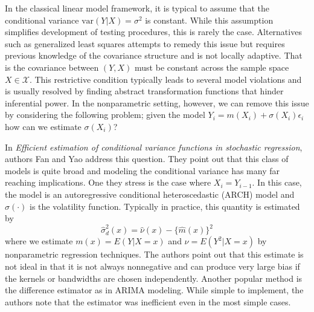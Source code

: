 \documentclass[12pt]{article}  %
\begin{document}
In the classical linear model framework, it is typical to assume that the conditional variance $\text{var}(Y|X) = \sigma^2$ is constant. While this assumption simplifies development of testing procedures, this is rarely the case. Alternatives such as generalized least squares attempts to remedy this issue but requires previous knowledge of the covariance structure and is not locally adaptive. That is the covariance between $(Y, X)$ must be constant across the sample space $X\in\mathcal{X}$. This restrictive condition typically leads to several model violations and is usually resolved by finding abstract transformation functions that hinder inferential power. In the nonparametric setting, however, we can remove this issue by considering the following problem; given the model $Y_i = m(X_i) + \sigma(X_i)\epsilon_i$ how can we estimate $\sigma(X_i)$? 

In \textit{Efficient estimation of conditional variance functions in stochastic regression}, authors Fan and Yao address this question. They point out that this class of models is quite broad and modeling the conditional variance has many far reaching implications. One they stress is the case where $X_i = Y_{i-1}$. In this case, the model is an autoregressive conditional heteroscedastic (ARCH) model and $\sigma(\cdot)$ is the volatility function. Typically in practice, this quantity is estimated by $$\hat{\sigma}_d^2(x) = \hat{\nu}(x)-\{\hat{m}(x)\}^2$$ where we estimate $m(x) = E(Y|X= x)$ and $\nu = E(Y^2|X = x)$ by nonparametric regression techniques. The authors point out that this estimate is not ideal in that it is not always nonnegative and can produce very large bias if the kernels or bandwidths are chosen independently. Another popular method is the difference estimator as in ARIMA modeling. While simple to implement, the authors note that the estimator was inefficient even in the most simple cases. 
\end{document}
